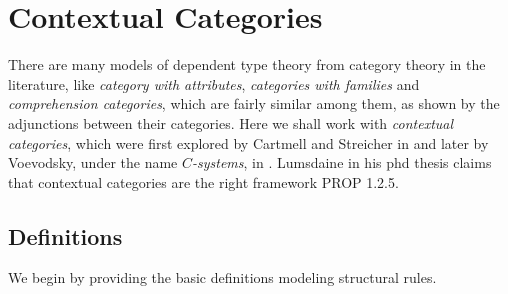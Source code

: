 \chapter{Contextual Categories}

There are many models of dependent type theory from category theory in
the literature, like \emph{category with attributes}, \emph{categories with
families} and \emph{comprehension categories}, which are
fairly similar among them, as shown by the adjunctions between their categories.
Here we shall work with \emph{contextual
categories}, which were first explored by Cartmell and Streicher in
 and later by Voevodsky, under the name $C$\emph{-systems},
in . Lumsdaine in his phd thesis claims that contextual
categories are the right framework PROP 1.2.5.

\section{Definitions}

We begin by providing the basic definitions modeling structural rules.

